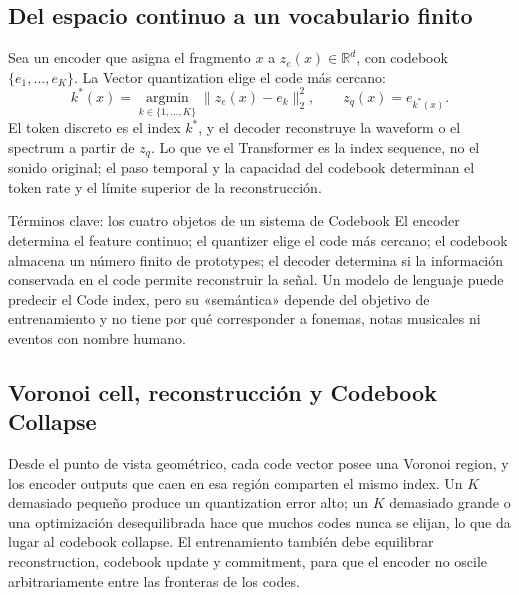\subsection{Del espacio continuo a un vocabulario finito}

Sea un encoder que asigna el fragmento $x$ a $z_e(x)\in\mathbb{R}^d$, con codebook $\{e_1,\ldots,e_K\}$. La Vector quantization elige el code más cercano:
\[
k^*(x)=\operatorname*{argmin}_{k\in\{1,\ldots,K\}}
\|z_e(x)-e_k\|_2^2,
\qquad z_q(x)=e_{k^*(x)}.
\]
El token discreto es el index $k^*$, y el decoder reconstruye la waveform o el spectrum a partir de $z_q$. Lo que ve el Transformer es la index sequence, no el sonido original; el paso temporal y la capacidad del codebook determinan el token rate y el límite superior de la reconstrucción.



\begin{knowledgebox}{Términos clave: los cuatro objetos de un sistema de Codebook}
El encoder determina el feature continuo; el quantizer elige el code más cercano; el codebook almacena un número finito de prototypes; el decoder determina si la información conservada en el code permite reconstruir la señal. Un modelo de lenguaje puede predecir el Code index, pero su «semántica» depende del objetivo de entrenamiento y no tiene por qué corresponder a fonemas, notas musicales ni eventos con nombre humano.
\end{knowledgebox}

\subsection{Voronoi cell, reconstrucción y Codebook Collapse}

Desde el punto de vista geométrico, cada code vector posee una Voronoi region, y los encoder outputs que caen en esa región comparten el mismo index. Un $K$ demasiado pequeño produce un quantization error alto; un $K$ demasiado grande o una optimización desequilibrada hace que muchos codes nunca se elijan, lo que da lugar al codebook collapse. El entrenamiento también debe equilibrar reconstruction, codebook update y commitment, para que el encoder no oscile arbitrariamente entre las fronteras de los codes.

